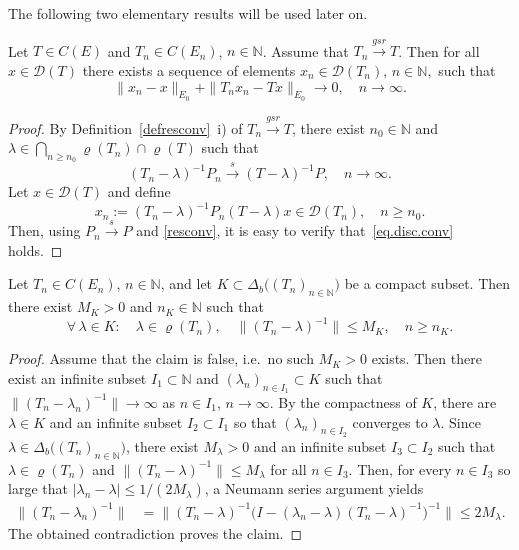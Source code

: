 \documentclass[a4paper,reqno]{amsart}
\begin{document}
{The following two elementary results will be used later on.
\begin{lemma}\label{AndAJndJnew}
Let $T\in C(E)$ and $T_n\in C(E_n)$, $n\in{\mathbb{N}}$. 
Assume that $T_n{\stackrel{gsr}{\rightarrow}} T$. Then
for all $x\in {\mathcal D}(T)$ there exists a sequence of elements $x_n\in{\mathcal D}(T_n), \,n\in{\mathbb{N}},$ such that 
    \begin{equation} \|x_n-x\|_{E_0}+\|T_nx_n-Tx\|_{E_0}{\longrightarrow} 0, \quad n\to\infty.\label{eq.disc.conv}\end{equation}
\end{lemma}

\begin{proof}
By Definition~\ref{defresconv}~i) of $T_n{\stackrel{gsr}{\rightarrow}} T$, there exist $n_0\in{\mathbb{N}}$ and $\lambda\in\underset{n\geq n_0}{\bigcap}\varrho(T_n)\cap\varrho(T)$ such that
\begin{equation} (T_n-\lambda)^{-1}P_n{\stackrel{s}{\longrightarrow}} (T-\lambda)^{-1}P, \quad n\to\infty.\label{resconv}\end{equation}
Let $x\in{\mathcal D}(T)$ and define $$x_n:=(T_n-\lambda)^{-1}P_n(T-\lambda)x\in{\mathcal D}(T_n), \quad n\geq n_0.$$
Then, using $P_n{\stackrel{s}{\rightarrow}} P$ and \eqref{resconv}, it is easy to verify that~\eqref{eq.disc.conv} holds.
\end{proof}

\begin{lemma}\label{lemma.regofbdd.compact}
Let $T_n\in C(E_n)$, $n\in{\mathbb{N}}$, and let $K\subset\Delta_b\big((T_n)_{n\in{\mathbb{N}}}\big)$ be a compact subset.
Then there exist $M_{K}>0$ and $n_{K}\in{\mathbb{N}}$ such that
$$\forall\,\lambda\in K:\quad \lambda\in\varrho(T_n), \quad \|(T_n-\lambda)^{-1}\|\leq M_K, \quad n\geq n_K.$$
\end{lemma}

\begin{proof}
Assume that the claim is false, i.e.\ no such $M_K>0$ exists. 
Then there exist an infinite subset $I_1\subset{\mathbb{N}}$ and $(\lambda_n)_{n\in I_1}\subset K$ such that $\|(T_n-\lambda_n)^{-1}\|\to\infty$ as $n\in I_1$, $n\to\infty$.
By the compactness of $K$, there are $\lambda\in K$ and an infinite subset $I_2\subset I_1$ so that $(\lambda_n)_{n\in I_2}$ converges to $\lambda$.
Since $\lambda\in \Delta_b\big((T_n)_{n\in{\mathbb{N}}}\big)$, there exist $M_\lambda>0$ and an infinite subset $I_3\subset I_2$ such that $\lambda\in\varrho(T_n)$ and $\|(T_n-\lambda)^{-1}\|\leq M_\lambda$ for all $n\in I_3$.
Then, for every $n\in I_3$ so large that $|\lambda_n-\lambda|\leq 1/(2M_\lambda)$, a Neumann series argument yields
\begin{align*}
\|(T_n-\lambda_n)^{-1}\|&=\big\|(T_n-\lambda)^{-1}\big(I-(\lambda_n-\lambda)(T_n-\lambda)^{-1}\big)^{-1}\big\|\leq 2 M_\lambda.
\end{align*}
The obtained contradiction proves the claim.
\end{proof}

}
\end{document}
